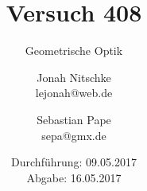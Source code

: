

\title{Versuch 408}
\subtitle{Geometrische Optik}
\author{Jonah Nitschke\\
        lejonah@web.de \and
        Sebastian Pape\\
        sepa@gmx.de}
\date{Durchführung: 09.05.2017\\
      Abgabe: 16.05.2017}



\maketitle
\newpage
\setcounter{page}{1}




\printbibliography


